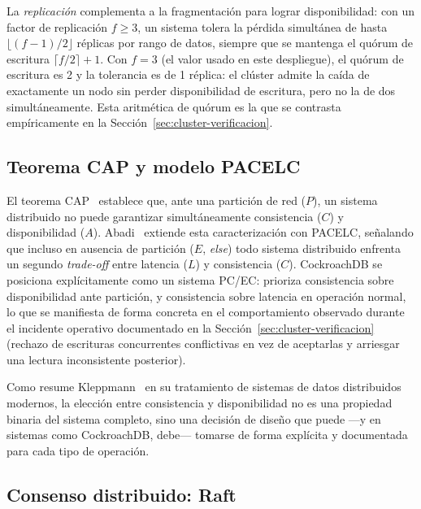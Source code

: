 La \emph{replicación} complementa a la fragmentación para lograr disponibilidad: con un factor de
replicación $f \geq 3$, un sistema tolera la pérdida simultánea de hasta
$\lfloor (f-1)/2 \rfloor$ réplicas por rango de datos, siempre que se mantenga el quórum de
escritura $\lceil f/2 \rceil + 1$. Con $f = 3$ (el valor usado en este despliegue), el quórum de
escritura es 2 y la tolerancia es de 1 réplica: el clúster admite la caída de exactamente un nodo
sin perder disponibilidad de escritura, pero no la de dos simultáneamente. Esta aritmética de
quórum es la que se contrasta empíricamente en la Sección~\ref{sec:cluster-verificacion}.

\subsection{Teorema CAP y modelo PACELC}

El teorema CAP~\cite{brewer2012cap} establece que, ante una partición de red ($P$), un sistema
distribuido no puede garantizar simultáneamente consistencia ($C$) y disponibilidad ($A$).
Abadi~\cite{abadi2012consistency} extiende esta caracterización con PACELC, señalando que incluso
en ausencia de partición ($E$, \emph{else}) todo sistema distribuido enfrenta un segundo
\emph{trade-off} entre latencia ($L$) y consistencia ($C$). CockroachDB se posiciona
explícitamente como un sistema PC/EC: prioriza consistencia sobre disponibilidad ante partición, y
consistencia sobre latencia en operación normal, lo que se manifiesta de forma concreta en el
comportamiento observado durante el incidente operativo documentado en la
Sección~\ref{sec:cluster-verificacion} (rechazo de escrituras concurrentes conflictivas en vez de
aceptarlas y arriesgar una lectura inconsistente posterior).

Como resume Kleppmann~\cite{kleppmann2017ddia} en su tratamiento de sistemas de datos distribuidos
modernos, la elección entre consistencia y disponibilidad no es una propiedad binaria del sistema
completo, sino una decisión de diseño que puede —y en sistemas como CockroachDB, debe— tomarse de
forma explícita y documentada para cada tipo de operación.

\subsection{Consenso distribuido: Raft}

